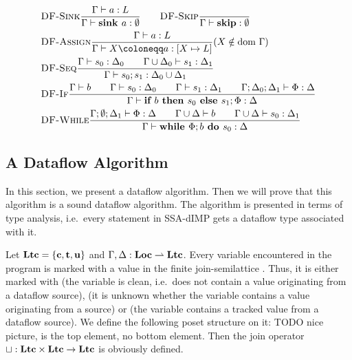 \begin{align*}
    &\rule{DF-Sink}{\typestep{\Gamma}{a}{L}}{\typestep{\Gamma}{\sink{a}}{\emptyset}}\qquad
    \rule{DF-Skip}{}{\typestep{\Gamma}{\skipcmd}{\emptyset}}\\
    &\rule{DF-Assign}{\typestep{\Gamma}{a}{L}}
    {\typestep{\Gamma}{\defaultstore}{[X \mapsto L]}} \text{($X \notin \dom\Gamma$)}\\
    &\rule{DF-Seq}{\typestep{\Gamma}{s_0}{\Delta_0}\qquad
    \typestep{\Gamma \cup \Delta_0}{s_1}{\Delta_1}}{\typestep{\Gamma}{\defaultssaseq}{\Delta_0 \cup \Delta_1}}\\
    &\rule{DF-If}{\typestmt{\Gamma}{b}\qquad\typestep{\Gamma}{s_0}{\Delta_0}\qquad \typestep{\Gamma}{s_1}{\Delta_1}\qquad
    \typestep{\Gamma;\Delta_0;\Delta_1}{\philist}{\Delta}}
    {\typestep{\Gamma}{\defaultssaif}{\Delta}}\\
    &\rule{DF-While}{\typestep{\Gamma;\emptyset;\Delta_1}{\philist}{\Delta}\qquad
    \typestmt{\Gamma \cup \Delta}{b}\qquad\typestep{\Gamma \cup \Delta}{s_0}{\Delta_1}}
    {\typestep{\Gamma}{\defaultssawhile}{\Delta}}
\end{align*}

\iffalse
\subsection{A Dataflow Algorithm}
In this section, we present a dataflow algorithm.
Then we will prove that this algorithm is a sound dataflow algorithm.
The algorithm is presented in terms of type analysis, i.e.\ every statement in 
SSA-dIMP gets a dataflow type associated with it.

Let $\textbf{Ltc} = \{\textbf{c}, \textbf{t}, \textbf{u}\}$ and
$\Gamma, \Delta: \textbf{Loc} \rightharpoonup \textbf{Ltc}$.
Every variable encountered in the program is marked with a value in the finite join-semilattice
\lattice.
Thus, it is either marked with \lclean (the variable
is clean, i.e.\ does not contain a value originating from a dataflow source), \lunknown
(it is unknown whether the variable contains a value originating from a source) or \ltracked
(the variable contains a tracked value from a dataflow source).
We define the following poset structure on it:
TODO nice picture, \lunknown is the top element, no bottom element.
Then the join operator $\mathbin\sqcup: \textbf{Ltc} \times \textbf{Ltc} \to \textbf{Ltc}$ is 
obviously defined.

